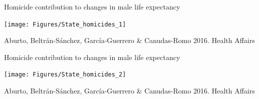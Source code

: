 \documentclass[xcolor={dvipsnames}]{beamer}
\begin{document}
%
%
%
%				
%
%
%
%
%
%
%	
%
%
%
%	
%
%
%
%
%


\begin{frame}
	\begin{center}
		\large{Homicide contribution to changes in male life expectancy}
	\end{center}

	\begin{center}
		\texttt{[image: Figures/State\_homicides\_1]}
	\end{center}
	
	\tiny{Aburto, Beltr\'an-S\'anchez, Garc\'ia-Guerrero \& Canudas-Romo 2016. Health Affairs}				
\end{frame}


\begin{frame}
	\begin{center}
\large{Homicide contribution to changes in male life expectancy}
	\end{center}


	\begin{center}
		\texttt{[image: Figures/State\_homicides\_2]}
	\end{center}
	
	\tiny{Aburto, Beltr\'an-S\'anchez, Garc\'ia-Guerrero \& Canudas-Romo 2016. Health Affairs}				
\end{frame}
\end{document}

